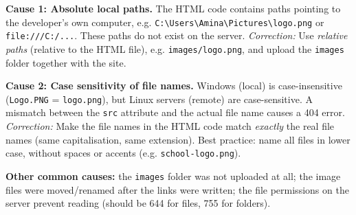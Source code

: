\documentclass[11pt]{article}
\begin{document}
\begin{corrige}
\textbf{Cause 1: Absolute local paths.} The HTML code contains paths pointing to the developer's own computer, e.g. \texttt{C:\textbackslash Users\textbackslash Amina\textbackslash Pictures\textbackslash logo.png} or \texttt{file:///C:/...}. These paths do not exist on the server.
\emph{Correction:} Use \emph{relative paths} (relative to the HTML file), e.g. \texttt{images/logo.png}, and upload the \texttt{images} folder together with the site.

\textbf{Cause 2: Case sensitivity of file names.} Windows (local) is case-insensitive (\texttt{Logo.PNG} = \texttt{logo.png}), but Linux servers (remote) are case-sensitive. A mismatch between the \texttt{src} attribute and the actual file name causes a 404 error.
\emph{Correction:} Make the file names in the HTML code match \emph{exactly} the real file names (same capitalisation, same extension). Best practice: name all files in lower case, without spaces or accents (e.g. \texttt{school-logo.png}).

\textbf{Other common causes:} the \texttt{images} folder was not uploaded at all; the image files were moved/renamed after the links were written; the file permissions on the server prevent reading (should be 644 for files, 755 for folders).
\end{corrige}
\end{document}
